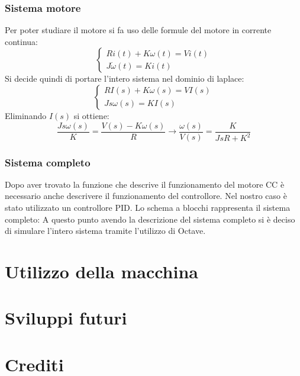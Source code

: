 \documentclass{report}
\begin{document}
\subsection{Sistema motore}
Per poter studiare il motore si fa uso delle formule del motore in corrente continua:
\begin{equation}
  \begin{cases}
    Ri(t)+K\omega(t)=Vi(t)\\
    J\dot \omega(t)=Ki(t)    
  \end{cases}
\end{equation}
Si decide quindi di portare l'intero sistema nel dominio di laplace:
\begin{equation}
  \begin{cases}
    RI(s)+K\omega(s)=VI(s)\\
    Js\omega(s)=KI(s)    
  \end{cases}
\end{equation}
Eliminando $I(s)$ si ottiene:
\begin{equation}
  \frac{Js\omega(s)}{K}=\frac{V(s)-K\omega(s)}{R}\longrightarrow\frac{\omega(s)}{V(s)}=\frac{K}{JsR+K^2}
\end{equation}
\subsection{Sistema completo}
Dopo aver trovato la funzione che descrive il funzionamento del motore CC è necessario anche descrivere il funzionamento del controllore. Nel nostro caso è stato utilizzato un controllore PID. Lo schema a blocchi rappresenta il sistema completo:
A questo punto avendo la descrizione del sistema completo si è deciso di simulare l'intero sistema tramite l'utilizzo di Octave.

\chapter{Utilizzo della macchina}

\chapter{Sviluppi futuri}

\chapter{Crediti}
\end{document}
